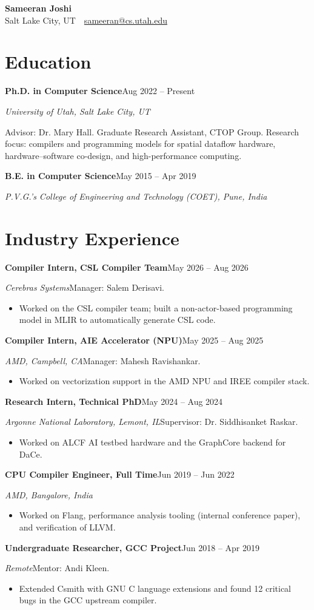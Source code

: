 \documentclass[10pt]{article}
\newcommand{\eduentry}[4]{%
  \textbf{#1}\hfill #3\par
  \textit{#2}\par
  #4\par
  \addvspace{4pt}
}
\newcommand{\expentry}[5]{%
  \textbf{#1}\hfill #3\par
  \textit{#2}\hfill {\small #4}\par
  \begin{itemize}
    \item #5
  \end{itemize}
  \addvspace{3pt}
}
\begin{document}
\fontsize{10.5pt}{12.5pt}\selectfont

\begin{center}
  {\LARGE \textbf{Sameeran Joshi}}\\[4pt]
  Salt Lake City, UT
  \,\textbullet\,
  \href{mailto:sameeran@cs.utah.edu}{sameeran@cs.utah.edu}
\end{center}

\section*{Education}

\eduentry{Ph.D. in Computer Science}{University of Utah, Salt Lake City, UT}{Aug 2022 -- Present}{%
Advisor: Dr. Mary Hall. Graduate Research Assistant, CTOP Group. Research focus: compilers and programming models for spatial dataflow hardware, hardware--software co-design, and high-performance computing.}

\eduentry{B.E. in Computer Science}{P.V.G.'s College of Engineering and Technology (COET), Pune, India}{May 2015 -- Apr 2019}{}

\section*{Industry Experience}

\expentry{Compiler Intern, CSL Compiler Team}{Cerebras Systems}{May 2026 -- Aug 2026}{Manager: Salem Derisavi.}{%
Worked on the CSL compiler team; built a non-actor-based programming model in MLIR to automatically generate CSL code.}

\expentry{Compiler Intern, AIE Accelerator (NPU)}{AMD, Campbell, CA}{May 2025 -- Aug 2025}{Manager: Mahesh Ravishankar.}{%
Worked on vectorization support in the AMD NPU and IREE compiler stack.}

\expentry{Research Intern, Technical PhD}{Argonne National Laboratory, Lemont, IL}{May 2024 -- Aug 2024}{Supervisor: Dr. Siddhisanket Raskar.}{%
Worked on ALCF AI testbed hardware and the GraphCore backend for DaCe.}

\expentry{CPU Compiler Engineer, Full Time}{AMD, Bangalore, India}{Jun 2019 -- Jun 2022}{}{%
Worked on Flang, performance analysis tooling (internal conference paper), and verification of LLVM.}

\expentry{Undergraduate Researcher, GCC Project}{Remote}{Jun 2018 -- Apr 2019}{Mentor: Andi Kleen.}{%
Extended Csmith with GNU C language extensions and found 12 critical bugs in the GCC upstream compiler.}
\end{document}
